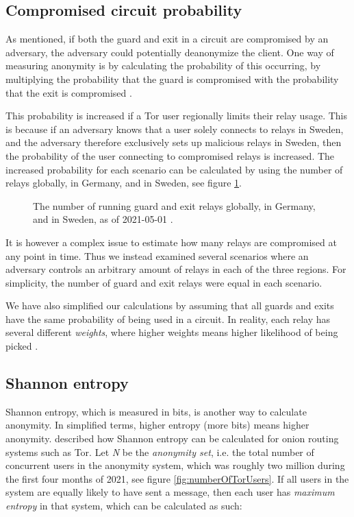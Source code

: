 \documentclass{kththesis}
\begin{document}
\subsection{Compromised circuit probability}
\label{section:compromisedProbability}
As mentioned, if both the guard and exit in a circuit are compromised by an adversary, the adversary could potentially deanonymize the client. One way of measuring anonymity is by calculating the probability of this occurring, by multiplying the probability that the guard is compromised with the probability that the exit is compromised \parencite{annessilower}. 

This probability is increased if a Tor user regionally limits their relay usage. This is because if an adversary knows that a user solely connects to relays in Sweden, and the adversary therefore exclusively sets up malicious relays in Sweden, then the probability of the user connecting to compromised relays is increased. The increased probability for each scenario can be calculated by using the number of relays globally, in Germany, and in Sweden, see figure \ref{fig:numberGuardExitRelays}.

\begin{figure}[!htb]
  \centering
  
  \caption{The number of running guard and exit relays globally, in Germany, and in Sweden, as of 2021-05-01 \parencite{TorRelaySearch}.}
  \label{fig:numberGuardExitRelays}
\end{figure}

It is however a complex issue to estimate how many relays are compromised at any point in time. Thus we instead examined several scenarios where an adversary controls an arbitrary amount of relays in each of the three regions. For simplicity, the number of guard and exit relays were equal in each scenario.

We have also simplified our calculations by assuming that all guards and exits have the same probability of being used in a circuit. In reality, each relay has several different \emph{weights}, where higher weights means higher likelihood of being picked \parencite{TorPathSpecification}.

\subsection{Shannon entropy}
\label{section:shannonentropy}
Shannon entropy, which is measured in bits, is another way to calculate anonymity. In simplified terms, higher entropy (more bits) means higher anonymity. \textcite{diaz2002towards} described how Shannon entropy can be calculated for onion routing systems such as Tor. Let \emph{N} be the \emph{anonymity set}, i.e. the total number of concurrent users in the anonymity system, which was roughly two million during the first four months of 2021, see figure \ref{fig:numberOfTorUsers}. If all users in the system are equally likely to have sent a message, then each user has \emph{maximum entropy} in that system, which can be calculated as such:
\end{document}
